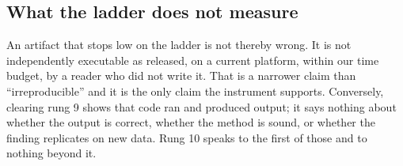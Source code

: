 \subsection{What the ladder does not measure}\label{sec:ladder_limits}

An artifact that stops low on the ladder is not thereby wrong. It is not
independently executable as released, on a current platform, within our time
budget, by a reader who did not write it. That is a narrower claim than
``irreproducible'' and it is the only claim the instrument supports. Conversely,
clearing rung 9 shows that code ran and produced output; it says nothing about
whether the output is correct, whether the method is sound, or whether the
finding replicates on new data. Rung 10 speaks to the first of those and to
nothing beyond it.
